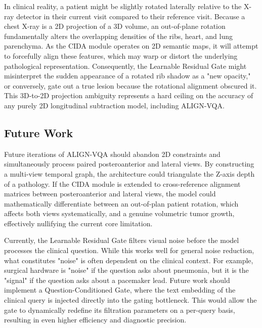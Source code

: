 In clinical reality, a patient might be slightly rotated laterally relative to the X-ray detector in their current visit compared to their reference visit. Because a chest X-ray is a 2D projection of a 3D volume, an out-of-plane rotation fundamentally alters the overlapping densities of the ribs, heart, and lung parenchyma. As the CIDA module operates on 2D semantic maps, it will attempt to forcefully align these features, which may warp or distort the underlying pathological representation. Consequently, the Learnable Residual Gate might misinterpret the sudden appearance of a rotated rib shadow as a "new opacity," or conversely, gate out a true lesion because the rotational alignment obscured it. This 3D-to-2D projection ambiguity represents a hard ceiling on the accuracy of any purely 2D longitudinal subtraction model, including ALIGN-VQA.

\subsection{Future Work}
Future iterations of ALIGN-VQA should abandon 2D constraints and simultaneously process paired posteroanterior and lateral views. By constructing a multi-view temporal graph, the architecture could triangulate the Z-axis depth of a pathology. If the CIDA module is extended to cross-reference alignment matrices between posteroanterior and lateral views, the model could mathematically differentiate between an out-of-plan patient rotation, which affects both views systematically, and a genuine volumetric tumor growth, effectively nullifying the current core limitation.

Currently, the Learnable Residual Gate filters visual noise before the model processes the clinical question. While this works well for general noise reduction, what constitutes "noise" is often dependent on the clinical context. For example, surgical hardware is "noise" if the question asks about pneumonia, but it is the "signal" if the question asks about a pacemaker lead. Future work should implement a Question-Conditioned Gate, where the text embedding of the clinical query is injected directly into the gating bottleneck. This would allow the gate to dynamically redefine its filtration parameters on a per-query basis, resulting in even higher efficiency and diagnostic precision.

